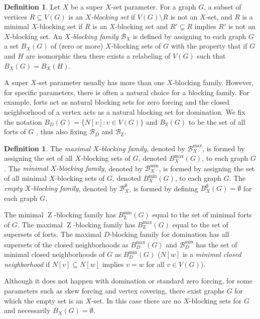\documentclass{article}
\numberwithin{figure}{section}
\numberwithin{table}{section}
\numberwithin{equation}{section}
\theoremstyle{definition}
\theoremstyle{definition}
\newtheorem{defn}[thm]{Definition}
\theoremstyle{definition}
\newcommand{\B}{\mathcal{B}}
\newcommand{\Z}{\operatorname{Z}}
\begin{document}
 
\begin{defn}\label{def:X-block-fam}
Let $X$ be a super $X$-set parameter. For a graph $G$, a subset of vertices $R\subseteq V(G)$ is an  \emph{$X$-blocking set} if $V(G)\setminus R$ is not an $X$-set, and $R$ is a minimal $X$-blocking set if $R$ is an $X$-blocking set and $R'\subsetneq R$ implies $R'$ is not an $X$-blocking set.
An \emph{$X$-blocking family} $\B_X$ is defined by assigning to each graph $G$ a set $B_X(G)$ of (zero or more) $X$-blocking sets of $G$ with the property that if $G$ and $H$ are isomorphic then there exists a relabeling of $V(G)$ such that $B_X(G) = B_X(H)$.  
\end{defn}





 A super $X$-set parameter usually has more than one $X$-blocking family. However, for specific parameters, there is often a natural choice for a blocking family. For example, forts act as natural blocking sets for zero forcing and the closed neighborhood of a vertex acts as a natural blocking set for domination. We fix the notation $B_D(G)=\{ N[v]: v\in V(G)\}$ and $B_{\Z}(G)$ to be the set of all forts of $G$  \cite{ZIR},  thus also fixing $\B_D$ and $\B_{\Z}$.


\begin{defn}
The \emph{maximal $X$-blocking family}, denoted by $\B_X^{\max}$, is formed by assigning the set of all $X$-blocking sets of $G$, denoted $B_X^{\max}(G)$,  to each graph $G$. The \emph{minimal $X$-blocking family}, denoted by $\B_X^{\min}$, is formed by assigning the set of all minimal $X$-blocking sets of $G$, denoted $B_X^{\min}(G)$, to each graph $G$.  The \emph{empty $X$-blocking family}, denoted by $\B_X^{\emptyset}$, is formed by defining $B_X^{\emptyset}(G)=\emptyset$ for each graph $G$.
\end{defn}

  The minimal $\Z$-blocking family has $B_{\Z}^{\min}(G)$ equal to the set of minimal forts of $G$.  The maximal $\Z$-blocking family has $B_{\Z}^{\max}(G)$ equal to the set of supersets of forts. 
 The maximal $D$-blocking family for domination has all supersets of the closed neighborhoods as $B^{\max}_D(G)$ and $\B^{\min}_D$ has the set of minimal closed neighborhoods of $G$ as $B^{\min}_D(G)$ ($N[w]$ is a \emph{minimal closed neighborhood} if $N[v]\subseteq N[w]$ implies $v=w$ for all $v\in V(G)$).
 
 Although it does not happen with domination or standard zero forcing, for some parameters such as skew forcing and vertex covering, there exist graphs $G$ for which the empty set is an $X$-set. 
 In this case there are no $X$-blocking sets for $G$ and necessarily $B_X(G)=\emptyset$.
\end{document}
